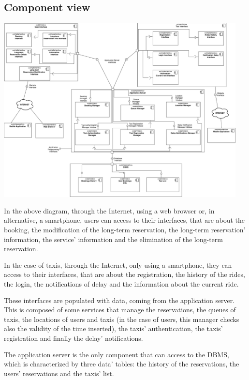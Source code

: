 \subsection{Component view}
	\begin{center}
		\includegraphics[width=0.95\textwidth]{./images/component_view.png}
	\end{center}
	
	In the above diagram, through the Internet, using a web browser or, in alternative, a smartphone, users can access to their interfaces, that are about the booking, the modification of the long-term reservation, the long-term reservation' information, the service' information and the elimination of the long-term reservation. 
	
	In the case of taxis, through the Internet, only using a smartphone, they can access to their interfaces, that are about the registration, the history of the rides, the login, the notifications of delay and the information about the current ride.
	
	These interfaces are populated with data, coming from the application server. This is composed of some services that manage the reservations, the queues of taxis, the locations of users and taxis (in the case of users, this manager checks also the validity of the time inserted), the taxis' authentication, the taxis' registration and finally the delay' notifications.
	
	The application server is the only component that can access to the DBMS, which is characterized by three data' tables: the history of the reservations, the users' reservations and the taxis' list.
